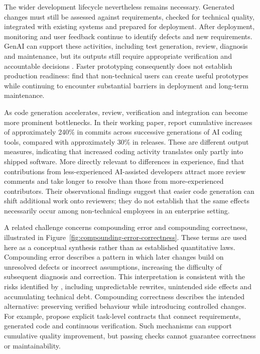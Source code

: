 \documentclass[10pt,a4paper]{article}
\begin{document}
The wider development lifecycle nevertheless remains necessary. Generated changes must still be assessed against requirements, checked for technical quality, integrated with existing systems and prepared for deployment. After deployment, monitoring and user feedback continue to identify defects and new requirements. GenAI can support these activities, including test generation, review, diagnosis and maintenance, but its outputs still require appropriate verification and accountable decisions \parencite{mandl2026}. Faster prototyping consequently does not establish production readiness: \textcite{kobiella2026} find that non-technical users can create useful prototypes while continuing to encounter substantial barriers in deployment and long-term maintenance.

As code generation accelerates, review, verification and integration can become more prominent bottlenecks. In their working paper, \textcite{demirer2026} report cumulative increases of approximately 240\% in commits across successive generations of AI coding tools, compared with approximately 30\% in releases. These are different output measures, indicating that increased coding activity translates only partly into shipped software. More directly relevant to differences in experience, \textcite{asdaque2026} find that contributions from less-experienced AI-assisted developers attract more review comments and take longer to resolve than those from more-experienced contributors. Their observational findings suggest that easier code generation can shift additional work onto reviewers; they do not establish that the same effects necessarily occur among non-technical employees in an enterprise setting.

A related challenge concerns compounding error and compounding correctness, illustrated in Figure~\ref{fig:compounding-error-correctness}. These terms are used here as a conceptual synthesis rather than as established quantitative laws. Compounding error describes a pattern in which later changes build on unresolved defects or incorrect assumptions, increasing the difficulty of subsequent diagnosis and correction. This interpretation is consistent with the risks identified by \textcite{meske2025}, including unpredictable rewrites, unintended side effects and accumulating technical debt. Compounding correctness describes the intended alternative: preserving verified behaviour while introducing controlled changes. For example, \textcite{wang2026vibecontract} propose explicit task-level contracts that connect requirements, generated code and continuous verification. Such mechanisms can support cumulative quality improvement, but passing checks cannot guarantee correctness or maintainability.
\end{document}
